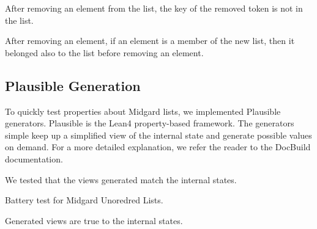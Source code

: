 \begin{theorem}
  \label{thm:MOList.Properties.AfterRemoveKey_not_member}
  \leanok
  After removing an element from the list, the key of the removed token is not in the list.
  \end{theorem}

\begin{theorem}
  \label{thm:MOList.Properties.OrdRemoves_members_back}
  \leanok
  After removing an element, if an element is a member of the new list, then it
belonged also to the list before removing an element.
  \end{theorem}

\subsection{Plausible Generation}
\label{sec:list:plausible}

To quickly test properties about Midgard lists, we implemented Plausible
generators.
%
Plausible is the Lean4 property-based framework.
%
The generators simple keep up a simplified view of the internal state and
generate possible values on demand.
%
For a more detailed explanation, we refer the reader to the DocBuild
documentation.

\begin{theorem}
  \label{thm:Tests.view_compliance_tests }
  \leanok
  We tested that the views generated match the internal states.
  \end{theorem}

\begin{theorem}
  \label{thm:Tests.unordered_list_tests} 
  \leanok
  Battery test for Midgard Unoredred Lists.
  \end{theorem}


\begin{theorem}
  \label{thm:Tests.view_checks} 
  \leanok
  Generated views are true to the internal states.
  \end{theorem}

